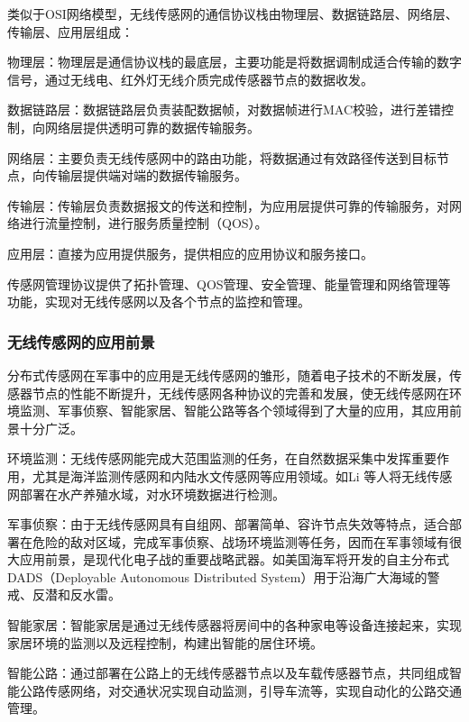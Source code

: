 类似于OSI网络模型，无线传感网的通信协议栈由物理层、数据链路层、网络层、传输层、应用层组成：

物理层：物理层是通信协议栈的最底层，主要功能是将数据调制成适合传输的数字信号，通过无线电、红外灯无线介质完成传感器节点的数据收发。

数据链路层：数据链路层负责装配数据帧，对数据帧进行MAC校验，进行差错控制，向网络层提供透明可靠的数据传输服务。

网络层：主要负责无线传感网中的路由功能，将数据通过有效路径传送到目标节点，向传输层提供端对端的数据传输服务。

传输层：传输层负责数据报文的传送和控制，为应用层提供可靠的传输服务，对网络进行流量控制，进行服务质量控制（QOS）。

应用层：直接为应用提供服务，提供相应的应用协议和服务接口。

传感网管理协议提供了拓扑管理、QOS管理、安全管理、能量管理和网络管理等功能，实现对无线传感网以及各个节点的监控和管理。
\subsubsection{无线传感网的应用前景}
分布式传感网在军事中的应用是无线传感网的雏形，随着电子技术的不断发展，传感器节点的性能不断提升，无线传感网各种协议的完善和发展，使无线传感网在环境监测、军事侦察、智能家居、智能公路等各个领域得到了大量的应用，其应用前景十分广泛。

\begin{compactitem}
  \item 环境监测：无线传感网能完成大范围监测的任务，在自然数据采集中发挥重要作用，尤其是海洋监测传感网和内陆水文传感网等应用领域。如Li 等人将无线传感网部署在水产养殖水域，对水环境数据进行检测。
  \item 军事侦察：由于无线传感网具有自组网、部署简单、容许节点失效等特点，适合部署在危险的敌对区域，完成军事侦察、战场环境监测等任务，因而在军事领域有很大应用前景，是现代化电子战的重要战略武器。如美国海军将开发的自主分布式DADS（Deployable Autonomous Distributed System）用于沿海广大海域的警戒、反潜和反水雷。
  \item 智能家居：智能家居是通过无线传感器将房间中的各种家电等设备连接起来，实现家居环境的监测以及远程控制，构建出智能的居住环境。
  \item 智能公路：通过部署在公路上的无线传感器节点以及车载传感器节点，共同组成智能公路传感网络，对交通状况实现自动监测，引导车流等，实现自动化的公路交通管理。
\end{compactitem}



